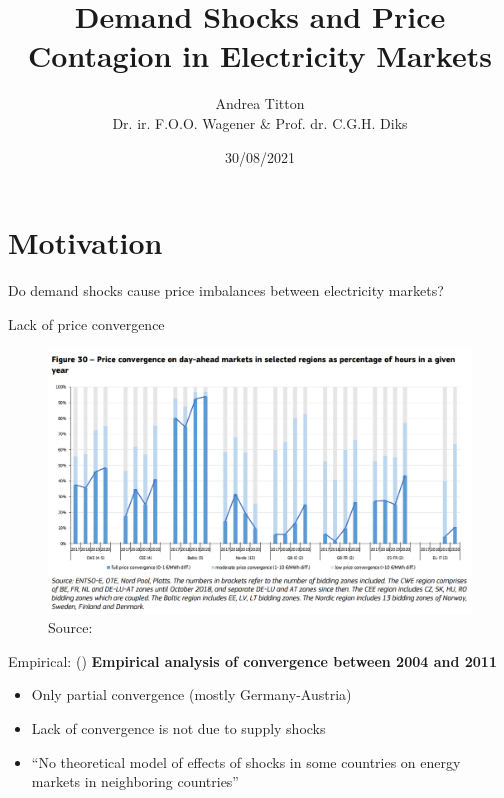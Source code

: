 \documentclass{beamer}
\author[Andrea Titton]{Andrea Titton\\[1ex]  {\small Dr. ir. F.O.O. Wagener \& Prof. dr. C.G.H. Diks}}
\title[Thesis Defence]{Demand Shocks and Price Contagion in Electricity Markets}
\institute{Tinbergen Institute}
\date{30/08/2021}
\begin{document}

\frame{\titlepage}

\section{Motivation}

\begin{frame}
    Do demand shocks cause price imbalances between electricity markets?
\end{frame}

\begin{frame}{Lack of price convergence}
    \begin{figure}
        \includegraphics[height = 0.7\textheight]{figures/convergence.PNG}
        \\ Source: \cite{Report2019}
    \end{figure}
\end{frame}

\begin{frame}{Empirical: \citeauthor{Bockers2014} (\citeyear{Bockers2014})}
    \textbf{Empirical analysis of convergence between 2004 and 2011}

    \begin{itemize} \setlength\itemsep{1.5em}
              \pause \item Only partial convergence (mostly Germany-Austria)
              \pause \item Lack of convergence is not due to supply shocks
              \pause \item ``No theoretical model of effects of shocks in some countries on energy markets in neighboring countries''
    \end{itemize}

\end{frame}
\end{document}
